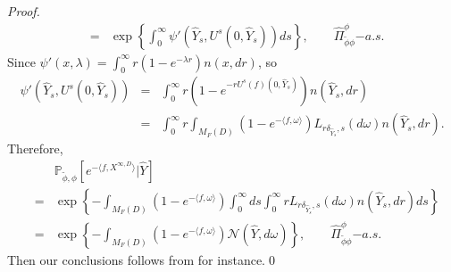\documentclass[12pt,a4paper]{amsart}
\numberwithin{equation}{section}
\theoremstyle{plain}
\theoremstyle{definition}
\begin{document}
{\begin{proof}
\begin{eqnarray*}
    &=&\exp\left\{\int_0^\infty \psi'(\widehat Y_s, U^s(0,\widehat Y_s))ds\right\},\qquad \widehat\Pi_{\widetilde\phi\phi}^\phi{\mathrm -a.s.}
  \end{eqnarray*}
  Since $\psi'(x,\lambda)=\int_0^\infty r(1-e^{-\lambda r})n(x,dr)$,  so
  \begin{eqnarray*}
    \psi'(\widehat Y_s, U^s(0,\widehat Y_s))&=&\int_0^\infty r
                                                (1-e^{-rU^s(f)(0,\widehat Y_s)})n(\widehat Y_s,dr)\\
                                            &=&\int_0^\infty r\int_{M_F(D)}(1-e^{-\langle f,\omega\rangle })L_{r\delta_{\widehat{Y}_s}, s}(d\omega)n(\widehat Y_s,dr).
  \end{eqnarray*}
  Therefore,
  \begin{eqnarray*}
    &&\mathbb P_{\widetilde\phi,\phi}\left[e^{-\langle f,X^{\infty,D}\rangle }\big|\widehat{Y}\right]\\
    &=&\exp\left\{-\int_{M_F(D)}(1-e^{-\langle f,\omega\rangle })\int_0^\infty ds\int_0^\infty rL_{r\delta_{\widehat{Y}_s}, s}(d\omega)n(\widehat Y_s,dr)ds\right\}\\
    &=&\exp\left\{-\int_{M_F(D)}(1-e^{-\langle f,\omega\rangle })\mathcal N(\widehat{Y}, d\omega)\right\},\qquad \widehat\Pi_{\widetilde\phi\phi}^\phi{\mathrm -a.s.}
  \end{eqnarray*}
  Then our conclusions follows from \cite[Theorem 3.4.1]{Dawson1992Infinitely} for instance.\qed
\end{proof}


\begin{comment}
\begin{thebibliography}{10}

\bibitem{AthreyaNey1972Branching}
  K.~B. Athreya and P.~E. Ney, \emph{Branching processes}, Springer-Verlag, New
  York-Heidelberg, 1972.

\bibitem{ChampagnatRoelly2008Limit}
  N.~Champagnat and S.~R{\oe}lly, \emph{Limit theorems for conditioned multitype
    {D}awson-{W}atanabe processes and {F}eller diffusions}, Electron. J. Probab.
  \textbf{13} (2008), no.~25, 777--810.

\bibitem{ChampagnatVillemonais2018Convergence}
  N.~Champagnat and D.~Villemonais, \emph{Convergence of the {F}leming-{V}iot
    process toward the minimal quasi-stationary distribution}, arXiv:1810.06849,
  2018.

\bibitem{Dawson1992Infinitely}
  D.~A. Dawson, \emph{Infinitely divisible random measures and superprocesses},
  Stochastic analysis and related topics ({S}ilivri, 1990), Progr. Probab.,
  vol.~31, Birkh\"{a}user Boston, Boston, MA, 1992, pp.~1--129.


\end{comment}}
\end{document}
